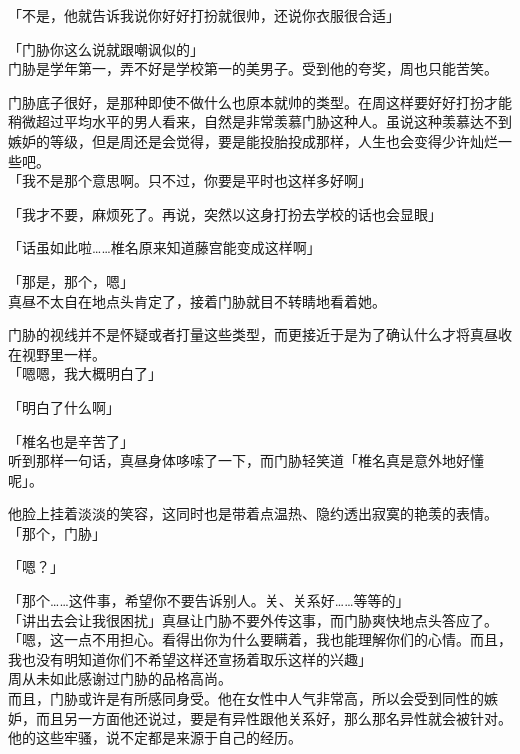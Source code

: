 「不是，他就告诉我说你好好打扮就很帅，还说你衣服很合适」

「门胁你这么说就跟嘲讽似的」\\

门胁是学年第一，弄不好是学校第一的美男子。受到他的夸奖，周也只能苦笑。

门胁底子很好，是那种即使不做什么也原本就帅的类型。在周这样要好好打扮才能稍微超过平均水平的男人看来，自然是非常羡慕门胁这种人。虽说这种羡慕达不到嫉妒的等级，但是周还是会觉得，要是能投胎投成那样，人生也会变得少许灿烂一些吧。\\

「我不是那个意思啊。只不过，你要是平时也这样多好啊」

「我才不要，麻烦死了。再说，突然以这身打扮去学校的话也会显眼」

「话虽如此啦……椎名原来知道藤宫能变成这样啊」

「那是，那个，嗯」\\

真昼不太自在地点头肯定了，接着门胁就目不转睛地看着她。

门胁的视线并不是怀疑或者打量这些类型，而更接近于是为了确认什么才将真昼收在视野里一样。\\

「嗯嗯，我大概明白了」

「明白了什么啊」

「椎名也是辛苦了」\\

听到那样一句话，真昼身体哆嗦了一下，而门胁轻笑道「椎名真是意外地好懂呢」。

他脸上挂着淡淡的笑容，这同时也是带着点温热、隐约透出寂寞的艳羡的表情。\\

「那个，门胁」

「嗯？」

「那个……这件事，希望你不要告诉别人。关、关系好……等等的」\\

「讲出去会让我很困扰」真昼让门胁不要外传这事，而门胁爽快地点头答应了。\\

「嗯，这一点不用担心。看得出你为什么要瞒着，我也能理解你们的心情。而且，我也没有明知道你们不希望这样还宣扬着取乐这样的兴趣」\\

周从未如此感谢过门胁的品格高尚。\\

而且，门胁或许是有所感同身受。他在女性中人气非常高，所以会受到同性的嫉妒，而且另一方面他还说过，要是有异性跟他关系好，那么那名异性就会被针对。他的这些牢骚，说不定都是来源于自己的经历。\\

